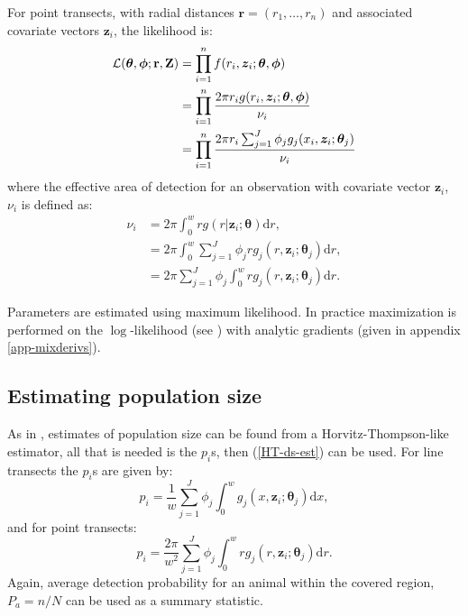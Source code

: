 For point transects, with radial distances $\mathbf{r}=\left (r_1,\ldots,r_n \right )$ and associated covariate vectors $\bm{z}_i$, the likelihood is:
\begin{align}
\mathcal{L}(\bm{\theta},\bm{\phi}; \mathbf{r},\mathbf{Z}) &= \prod_{i=1}^n f(r_i,\bm{z}_i; \bm{\theta},\bm{\phi}) \notag \\
&= \prod_{i=1}^n \frac{2 \pi r_i g(r_i,\bm{z}_i; \bm{\theta},\bm{\phi})}{\nu_i} \notag \\
&= \prod_{i=1}^n \frac{2 \pi r_i \sum_{j=1}^J \phi_j g_j(x_i,\bm{z}_i; \bm{\theta}_j)}{\nu_i} \label{pt-lik}
\end{align}
where the effective area of detection for an observation with covariate vector $\mathbf{z}_i$, $\nu_i$ is defined as:
\begin{align*}
\nu_i &= 2\pi \int_0^w  r g(r \vert \bm{z}_i; \bm{\theta}) \text{d}r,\\
& = 2\pi  \int_0^w  \sum_{j=1}^J \phi_j r g_j(r,\bm{z}_i; \bm{\theta}_j) \text{d}r,\\
& = 2\pi \sum_{j=1}^J \phi_j \int_0^w  r g_j(r,\bm{z}_i; \bm{\theta}_j) \text{d}r.
\end{align*}\label{cor-8s7}

Parameters are estimated using maximum likelihood. In practice maximization is performed on the $\log$-likelihood (see ) with analytic gradients (given in appendix \ref{app-mixderivs}).



\subsection{Estimating population size}

As in , estimates of population size can be found from a Horvitz-Thompson-like estimator, all that is needed is the $p_i$s, then (\ref{HT-ds-est}) can be used. For line transects the $p_i$s are given by:
\begin{equation*}
p_i = \frac{1}{w} \sum_{j=1}^J \phi_j \int_0^w  g_j(x,\mathbf{z}_i; \bm{\theta}_j) \text{d}x,
\end{equation*}
and for point transects:
\begin{equation*}
p_i = \frac{2\pi}{w^2} \sum_{j=1}^J \phi_j \int_0^w  r g_j(r,\mathbf{z}_i; \bm{\theta}_j) \text{d}r.
\end{equation*}
Again, average detection probability for an animal within the covered region, $P_a=n/N$ can be used as a summary statistic.

